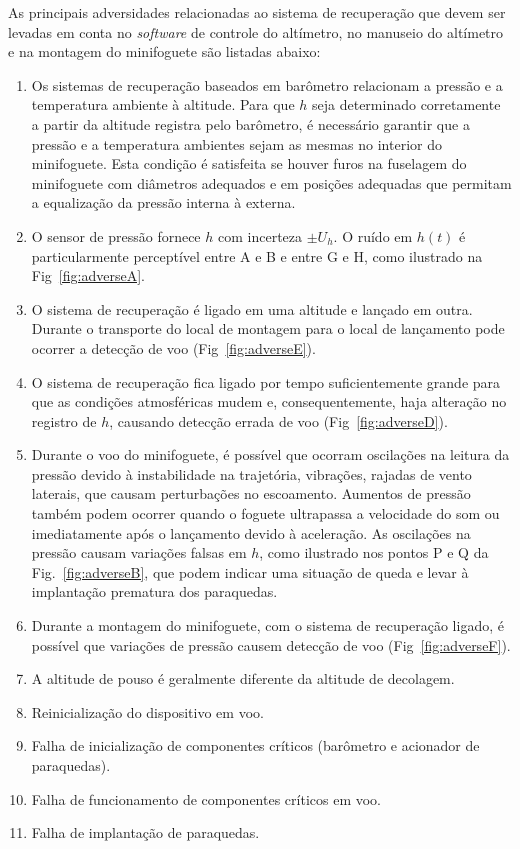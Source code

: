 \documentclass[12pt,a4paper]{article}
\begin{document}
As principais adversidades relacionadas ao sistema de recuperação que devem ser levadas em conta no \textit{software} de controle do altímetro, no manuseio do altímetro e na montagem do minifoguete são listadas abaixo: 
\begin{enumerate}
	\item Os sistemas de recuperação baseados em barômetro relacionam a pressão e a temperatura ambiente à altitude. Para que $h$ seja determinado corretamente a partir da altitude registra pelo barômetro, é necessário garantir que a pressão e a temperatura ambientes sejam as mesmas no interior do minifoguete. Esta condição é satisfeita se houver furos na fuselagem do minifoguete com diâmetros adequados e em posições adequadas\cite{PerfectFlite} que permitam a equalização da pressão interna à externa.
	
	\item O sensor de pressão fornece $h$ com incerteza $\pm U_h$. O ruído em $h(t)$ é particularmente perceptível entre A e B e entre G e H, como ilustrado na Fig~\ref{fig:adverseA}.
	\item O sistema de recuperação é ligado em uma altitude e lançado em outra. Durante o transporte do local de montagem para o local de lançamento pode ocorrer a detecção de voo (Fig~\ref{fig:adverseE}).
	\item O sistema de recuperação fica ligado por tempo suficientemente grande para que as condições atmosféricas mudem e, consequentemente, haja alteração no registro de $h$, causando detecção errada de voo (Fig~\ref{fig:adverseD}).
	\item Durante o voo do minifoguete, é possível que ocorram oscilações na leitura da pressão devido à instabilidade na trajetória, vibrações, rajadas de vento laterais, que causam perturbações no escoamento.  Aumentos de pressão  também podem ocorrer quando o foguete ultrapassa a velocidade do som ou imediatamente após o lançamento devido à aceleração. As oscilações na pressão causam variações falsas em $h$, como ilustrado nos pontos P e Q da Fig.~\ref{fig:adverseB}, que podem indicar uma situação de queda e levar à implantação prematura dos paraquedas.
	\item Durante a montagem do minifoguete, com o sistema de recuperação ligado, é possível que variações de pressão causem detecção de voo (Fig~\ref{fig:adverseF}).
	\item A altitude de pouso é geralmente diferente da altitude de decolagem.
	\item Reinicialização do dispositivo em voo.
	\item Falha de inicialização de componentes críticos (barômetro e acionador de paraquedas).
	\item Falha de funcionamento de componentes críticos em voo.
	\item Falha de implantação de paraquedas.
\end{enumerate}
\end{document}
